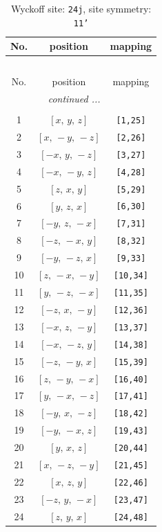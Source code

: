 \documentclass[fleqn,8pt]{jsarticle}
\begin{document}
\begin{longtable}{ccc}
\caption{Wyckoff site: {\tt 24j}, site symmetry: {\tt 11'}}
 \\
 \hline \hline
No. & position & mapping \\ \hline \endfirsthead

\multicolumn{2}{l}{\tablename\ \thetable{}} \\
 \hline \hline
No. & position & mapping \\ \hline \endhead

 \hline \hline
\multicolumn{2}{r}{\footnotesize\it continued ...} \\ \endfoot

 \hline \hline
\multicolumn{2}{r}{} \\ \endlastfoot

1 & $\left[ x,\, y,\, z \right]$ & {\tt [1,25]} \\ \hline
2 & $\left[ x,\, - y,\, - z \right]$ & {\tt [2,26]} \\ \hline
3 & $\left[ - x,\, y,\, - z \right]$ & {\tt [3,27]} \\ \hline
4 & $\left[ - x,\, - y,\, z \right]$ & {\tt [4,28]} \\ \hline
5 & $\left[ z,\, x,\, y \right]$ & {\tt [5,29]} \\ \hline
6 & $\left[ y,\, z,\, x \right]$ & {\tt [6,30]} \\ \hline
7 & $\left[ - y,\, z,\, - x \right]$ & {\tt [7,31]} \\ \hline
8 & $\left[ - z,\, - x,\, y \right]$ & {\tt [8,32]} \\ \hline
9 & $\left[ - y,\, - z,\, x \right]$ & {\tt [9,33]} \\ \hline
10 & $\left[ z,\, - x,\, - y \right]$ & {\tt [10,34]} \\ \hline
11 & $\left[ y,\, - z,\, - x \right]$ & {\tt [11,35]} \\ \hline
12 & $\left[ - z,\, x,\, - y \right]$ & {\tt [12,36]} \\ \hline
13 & $\left[ - x,\, z,\, - y \right]$ & {\tt [13,37]} \\ \hline
14 & $\left[ - x,\, - z,\, y \right]$ & {\tt [14,38]} \\ \hline
15 & $\left[ - z,\, - y,\, x \right]$ & {\tt [15,39]} \\ \hline
16 & $\left[ z,\, - y,\, - x \right]$ & {\tt [16,40]} \\ \hline
17 & $\left[ y,\, - x,\, - z \right]$ & {\tt [17,41]} \\ \hline
18 & $\left[ - y,\, x,\, - z \right]$ & {\tt [18,42]} \\ \hline
19 & $\left[ - y,\, - x,\, z \right]$ & {\tt [19,43]} \\ \hline
20 & $\left[ y,\, x,\, z \right]$ & {\tt [20,44]} \\ \hline
21 & $\left[ x,\, - z,\, - y \right]$ & {\tt [21,45]} \\ \hline
22 & $\left[ x,\, z,\, y \right]$ & {\tt [22,46]} \\ \hline
23 & $\left[ - z,\, y,\, - x \right]$ & {\tt [23,47]} \\ \hline
24 & $\left[ z,\, y,\, x \right]$ & {\tt [24,48]} \\
\end{longtable}
\end{document}
